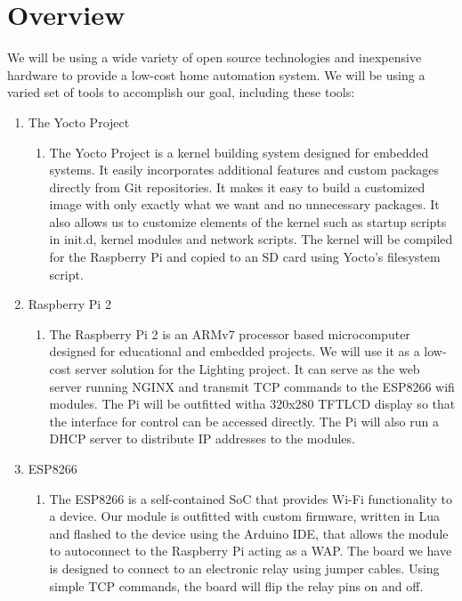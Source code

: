 \documentclass[oneside,openright]{book}
\begin{document}
\section{Overview}
We will be using a wide variety of open source technologies and inexpensive hardware to provide a low-cost home automation system. We will be using a varied set of tools to accomplish our goal, including these tools:
\begin{enumerate}
\item The Yocto Project 
\begin{enumerate}
\item The Yocto Project is a kernel building system designed for embedded systems. It easily incorporates additional features and custom packages directly from Git repositories. It makes it easy to build a customized image with only exactly what we want and no unnecessary packages. It also allows us to customize elements of the kernel such as startup scripts in init.d, kernel modules and network scripts. The kernel will be compiled for the Raspberry Pi and copied to an SD card using Yocto's filesystem script.
\end{enumerate} 
\item Raspberry Pi 2
\begin{enumerate}
\item The Raspberry Pi 2 is an ARMv7 processor based microcomputer designed for educational and embedded projects. We will use it as a low-cost server solution for the Lighting project. It can serve as the web server running NGINX and transmit TCP commands to the ESP8266 wifi modules. The Pi will be outfitted witha 320x280 TFTLCD display so that the interface for control can be accessed directly. The Pi will also run a DHCP server to distribute IP addresses to the modules.
\end{enumerate} 
\item ESP8266
\begin{enumerate}
\item The ESP8266 is a self-contained SoC that provides Wi-Fi functionality to a device. Our module is outfitted with custom firmware, written in Lua and flashed to the device using the Arduino IDE, that allows the module to autoconnect to the Raspberry Pi acting as a WAP. The board we have is designed to connect to an electronic relay using jumper cables. Using simple TCP commands, the board will flip the relay pins on and off.
\end{enumerate}
\end{enumerate}
\end{document}
